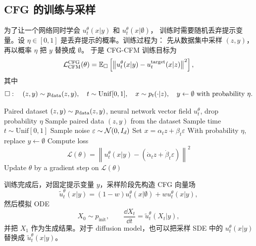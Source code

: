 \subsection{CFG 的训练与采样}

为了让一个网络同时学会 $u_t^\theta(x|y)$ 和 $u_t^\theta(x|\emptyset)$，
训练时需要随机丢弃提示变量。设 $\eta\in[0,1]$ 是丢弃提示的概率。训练过程为：
先从数据集中采样 $(z,y)$，再以概率 $\eta$ 把 $y$ 替换成 $\emptyset$。
于是 CFG-CFM 训练目标为
\begin{equation}
  \mathcal{L}^{\mathrm{CFG}}_{\mathrm{CFM}}(\theta)
  =
  \mathbb{E}_{\square}
  \left[
    \left\|
    u_t^\theta(x|y)-u_t^{\mathrm{target}}(x|z)
    \right\|^2
  \right],
\end{equation}
其中
\begin{equation}
  \square:
  \quad
  (z,y)\sim p_{\mathrm{data}}(z,y),\quad
  t\sim\mathrm{Unif}[0,1],\quad
  x\sim p_t(\cdot|z),\quad
  y\leftarrow\emptyset\ \text{with probability }\eta.
\end{equation}

\begin{algorithm}
\caption{Classifier-Free Guidance Training for Gaussian Probability Path}
\begin{algorithmic}[1]
\Require Paired dataset $(z,y)\sim p_{\mathrm{data}}(z,y)$, neural network vector field $u_t^\theta$, drop probability $\eta$
    \State Sample paired data $(z,y)$ from the dataset
    \State Sample time $t\sim\mathrm{Unif}[0,1]$
    \State Sample noise $\varepsilon\sim\mathcal{N}(0,I_d)$
    \State Set $x=\alpha_t z+\beta_t\varepsilon$
    \State With probability $\eta$, replace $y\leftarrow\emptyset$
    \State Compute loss
    \begin{equation}
      \mathcal{L}(\theta)
      =
      \left\|
      u_t^\theta(x|y)-(\dot{\alpha}_t z+\dot{\beta}_t\varepsilon)
      \right\|^2
    \end{equation}
    \State Update $\theta$ by a gradient step on $\mathcal{L}(\theta)$
\EndFor
\end{algorithmic}
\end{algorithm}

训练完成后，对固定提示变量 $y$，采样阶段先构造 CFG 向量场
\begin{equation}
  \widetilde{u}_t^\theta(x|y)
  =
  (1-w)u_t^\theta(x|\emptyset)+wu_t^\theta(x|y),
\end{equation}
然后模拟 ODE
\begin{equation}
  X_0\sim p_{\mathrm{init}},
  \qquad
  \frac{\dd X_t}{\dd t}
  =
  \widetilde{u}_t^\theta(X_t|y),
\end{equation}
并把 $X_1$ 作为生成结果。对于 diffusion model，也可以把采样 SDE 中的
$u_t^\theta(x|y)$ 替换成 $\widetilde{u}_t^\theta(x|y)$。

